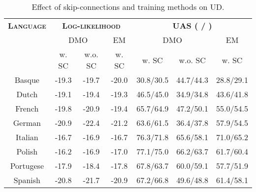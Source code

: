 \documentclass[11pt]{article}
\begin{document}
\begin{table}[t]
\centering
\small
\begin{tabular}{c|cc|c|cc|c}
\hline
\bf\textsc{Language}  & \multicolumn{3}{c|}{\bf\textsc{Log-likelihood}}          & \multicolumn{3}{c}{\bf\textsc{UAS (  / )}}    \\ \cline{2-7} 
          & \multicolumn{2}{c|}{DMO}             & EM    & \multicolumn{2}{c|}{DMO}               & EM        \\ \cline{2-7} 
          & \multicolumn{1}{c|}{w. SC} & w.o. SC & w. SC & \multicolumn{1}{c|}{w. SC} & w.o. SC   & w. SC     \\ \hline
Basque    & -19.3                      & -19.7   & -20.0 & 30.8/30.5                  & 44.7/44.3 & 28.8/29.1 \\
Dutch     & -19.1                      & -19.4   & -19.3 & 46.5/45.0                  & 34.9/34.8 & 43.6/41.8 \\
French    & -19.8                      & -20.9   & -19.4 & 65.7/64.9                  & 47.2/50.1 & 55.0/54.5 \\
German    & -20.9                      & -22.4   & -21.2 & 63.6/61.5                  & 36.4/37.8 & 57.9/54.5 \\
Italian   & -16.7                      & -16.9   & -16.7 & 76.3/71.8                  & 65.6/58.1 & 71.0/65.2 \\
Polish    & -16.2                      & -16.9   & -17.0 & 77.1/75.0                  & 66.2/63.7 & 61.7/60.4 \\
Portugese & -17.9                      & -18.4   & -17.8 & 67.8/63.7                  & 60.0/59.1 & 57.7/51.9 \\
Spanish   & -20.8                      & -21.7   & -20.9 & 67.2/66.8                  & 49.6/48.8 & 61.4/58.1 \\ \hline
\end{tabular}
\caption{Effect of skip-connections and training methods on UD.}
\label{UD: SC and EM}
\end{table}
\end{document}
